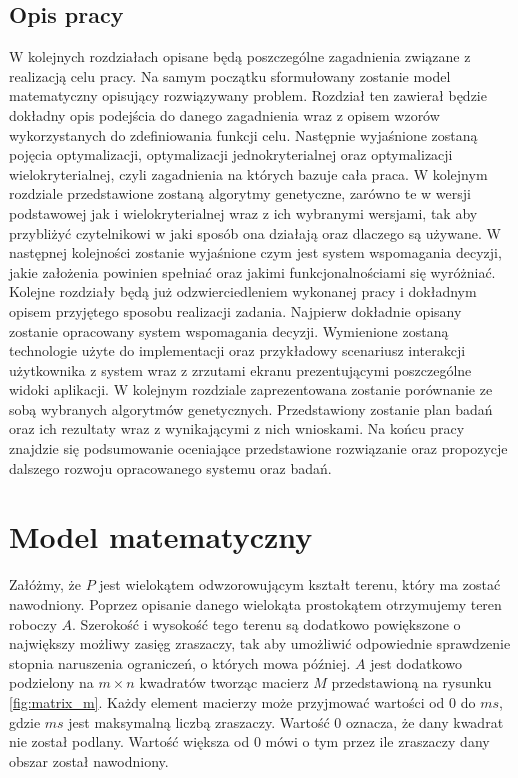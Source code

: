 \documentclass[twoside]{iisthesis}
\begin{document}
\section{Opis pracy}
W kolejnych rozdziałach opisane będą poszczególne zagadnienia związane z realizacją celu pracy. Na samym początku sformułowany zostanie model matematyczny opisujący rozwiązywany problem. Rozdział ten zawierał będzie dokładny opis podejścia do danego zagadnienia wraz z opisem wzorów wykorzystanych do zdefiniowania funkcji celu. Następnie wyjaśnione zostaną pojęcia optymalizacji, optymalizacji jednokryterialnej oraz optymalizacji wielokryterialnej, czyli zagadnienia na których bazuje cała praca. W kolejnym rozdziale przedstawione zostaną algorytmy genetyczne, zarówno te w wersji podstawowej jak i wielokryterialnej wraz z ich wybranymi wersjami, tak aby przybliżyć czytelnikowi w jaki sposób ona działają oraz dlaczego są używane. W następnej kolejności zostanie wyjaśnione czym jest system wspomagania decyzji, jakie założenia powinien spełniać oraz jakimi funkcjonalnościami się wyróżniać. Kolejne rozdziały będą już odzwierciedleniem wykonanej pracy i dokładnym opisem przyjętego sposobu realizacji zadania. Najpierw dokładnie opisany zostanie opracowany system wspomagania decyzji. Wymienione zostaną technologie użyte do implementacji oraz przykładowy scenariusz interakcji użytkownika z system wraz z zrzutami ekranu prezentującymi poszczególne widoki aplikacji. W kolejnym rozdziale zaprezentowana zostanie porównanie ze sobą wybranych algorytmów genetycznych. Przedstawiony zostanie plan badań oraz ich rezultaty wraz z wynikającymi z nich wnioskami. Na końcu pracy znajdzie się podsumowanie oceniające przedstawione rozwiązanie oraz propozycje dalszego rozwoju opracowanego systemu oraz badań.

\chapter{Model matematyczny}
Załóżmy, że $P$ jest wielokątem odwzorowującym kształt terenu, który ma zostać nawodniony. Poprzez opisanie danego wielokąta prostokątem otrzymujemy teren roboczy $A$. Szerokość i wysokość tego terenu są dodatkowo powiększone o największy możliwy zasięg zraszaczy, tak aby umożliwić odpowiednie sprawdzenie stopnia naruszenia ograniczeń, o których mowa później. $A$ jest dodatkowo podzielony na $m \times n$ kwadratów tworząc macierz $M$ przedstawioną na rysunku \eqref{fig:matrix_m}. Każdy element macierzy może przyjmować wartości od 0 do $ms$, gdzie $ms$ jest maksymalną liczbą zraszaczy. Wartość 0 oznacza, że dany kwadrat nie został podlany. Wartość większa od 0 mówi o tym przez ile zraszaczy dany obszar został nawodniony.
\end{document}
